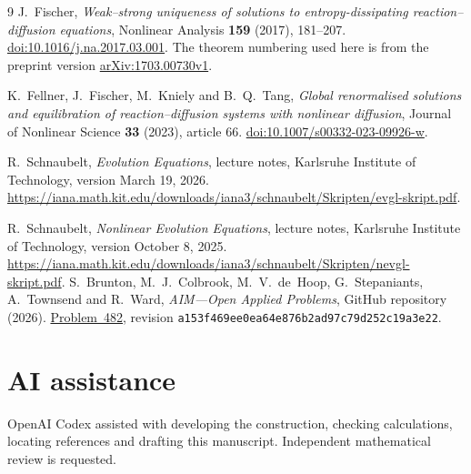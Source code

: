 \documentclass[11pt]{article}
\theoremstyle{definition}
\begin{document}
\begin{thebibliography}{9}
J.~Fischer, \emph{Weak--strong uniqueness of solutions to entropy-dissipating
reaction--diffusion equations}, Nonlinear Analysis \textbf{159} (2017),
181--207. \href{https://doi.org/10.1016/j.na.2017.03.001}{doi:10.1016/j.na.2017.03.001}.
The theorem numbering used here is from the preprint version
\href{https://arxiv.org/abs/1703.00730v1}{arXiv:1703.00730v1}.

K.~Fellner, J.~Fischer, M.~Kniely and B.~Q.~Tang,
\emph{Global renormalised solutions and equilibration of reaction--diffusion
systems with nonlinear diffusion}, Journal of Nonlinear Science
\textbf{33} (2023), article 66.
\href{https://doi.org/10.1007/s00332-023-09926-w}{doi:10.1007/s00332-023-09926-w}.

R.~Schnaubelt, \emph{Evolution Equations}, lecture notes, Karlsruhe Institute
of Technology, version March 19, 2026.
\url{https://iana.math.kit.edu/downloads/iana3/schnaubelt/Skripten/evgl-skript.pdf}.

R.~Schnaubelt, \emph{Nonlinear Evolution Equations}, lecture notes,
Karlsruhe Institute of Technology, version October 8, 2025.
\url{https://iana.math.kit.edu/downloads/iana3/schnaubelt/Skripten/nevgl-skript.pdf}.
S.~Brunton, M.~J.~Colbrook, M.~V.~de~Hoop, G.~Stepaniants, A.~Townsend and
R.~Ward, \emph{AIM---Open Applied Problems}, GitHub repository (2026).
\href{https://github.com/MColbrook/AIM/blob/a153f469ee0ea64e876b2ad97c79d252c19a3e22/problems/482-entropy-reaction-diffusion-renormalized-uniqueness.md}{Problem~482},
revision \texttt{a153f469ee0ea64e876b2ad97c79d252c19a3e22}.
\end{thebibliography}

\section*{AI assistance}
OpenAI Codex assisted with developing the construction, checking calculations,
locating references and drafting this manuscript. Independent mathematical
review is requested.
\end{document}
